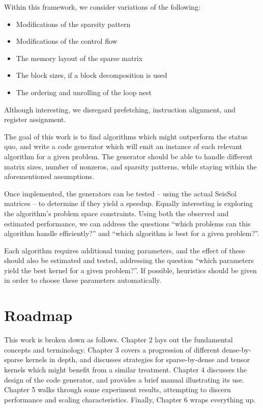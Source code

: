  Within this framework, we consider variations of the following:
  \begin{itemize}
    \item Modifications of the sparsity pattern
    \item Modifications of the control flow
    \item The memory layout of the sparse matrix
    \item The block sizes, if a block decomposition is used
    \item The ordering and unrolling of the loop nest
  \end{itemize}


Although interesting, we disregard prefetching, instruction alignment, and register assignment. 

The goal of this work is to find algorithms which might outperform the status quo, and write a code generator which will emit an instance of each relevant algorithm for a given problem. The generator should be able to handle different matrix sizes, number of nonzeros, and sparsity patterns, while staying within the aforementioned assumptions. 

Once implemented, the generators can be tested -- using the actual SeisSol matrices -- to determine if they yield a speedup. Equally interesting is exploring the algorithm's problem space constraints. Using both the observed and estimated performance, we can address the questions ``which problems can this algorithm handle efficiently?'' and ``which algorithm is best for a given problem?''. 

Each algorithm requires additional tuning parameters, and the effect of these should also be estimated and tested, addressing the question ``which parameters yield the best kernel for a given problem?''. If possible, heuristics should be given in order to choose these parameters automatically.

   
\section{Roadmap} 
  This work is broken down as follows. Chapter 2 lays out the fundamental concepts and terminology. Chapter 3 covers a progression of different dense-by-sparse kernels in depth, and discusses strategies for sparse-by-dense and tensor kernels which might benefit from a similar treatment. Chapter 4 discusses the design of the code generator, and provides a brief manual illustrating its use. Chapter 5 walks through some experiment results, attempting to discern performance and scaling characteristics. Finally, Chapter 6 wraps everything up.










